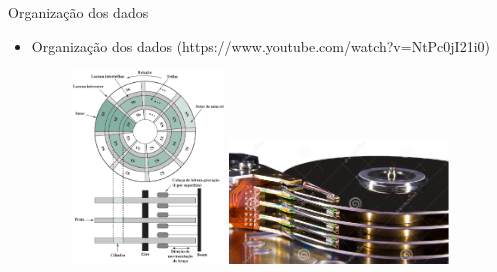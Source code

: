\begin{slide}{Organização dos dados}
	\begin{itemize}
		\item Organização dos dados (https://www.youtube.com/watch?v=NtPc0jI21i0)
			\begin{figure}[h]
				\centering
				\includegraphics[width=0.38\textwidth]{figs/layout-disco}
				\includegraphics[width=0.55\textwidth]{figs/hd}
			\end{figure}
	\end{itemize}
\end{slide}

